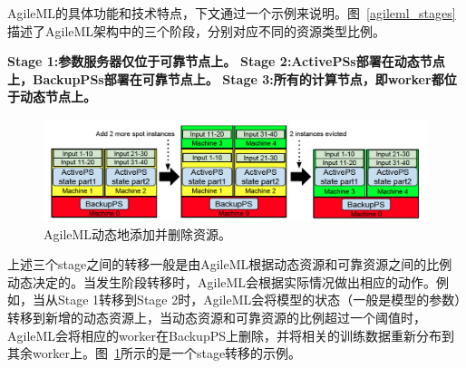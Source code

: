 AgileML的具体功能和技术特点，下文通过一个示例来说明。图~\ref{agileml_stages}描述了AgileML架构中的三个阶段，分别对应不同的资源类型比例。

\textbf{Stage 1:参数服务器仅位于可靠节点上。}%
\textbf{Stage 2:ActivePSs部署在动态节点上，BackupPSs部署在可靠节点上。}%
\textbf{Stage 3:所有的计算节点，即worker都位于动态节点上。}%

\begin{figure}[h]
    \centerline{\includegraphics[width=\textwidth]{figures/stage-trans.png}}
    \caption{AgileML动态地添加并删除资源。}
    \label{stage_trans}
\end{figure}

上述三个stage之间的转移一般是由AgileML根据动态资源和可靠资源之间的比例动态决定的。当发生阶段转移时，AgileML会根据实际情况做出相应的动作。例如，当从Stage 1转移到Stage 2时，AgileML会将模型的状态（一般是模型的参数）转移到新增的动态资源上，当动态资源和可靠资源的比例超过一个阈值时，AgileML会将相应的worker在BackupPS上删除，并将相关的训练数据重新分布到其余worker上。图~\ref{stage_trans}所示的是一个stage转移的示例。

